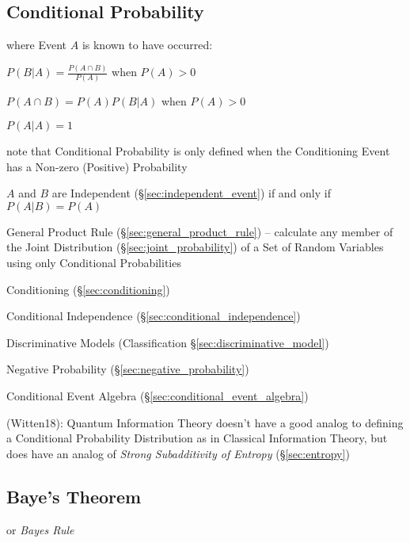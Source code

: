 \subsection{Conditional Probability}\label{sec:conditional_probability}

where Event $A$ is known to have occurred:

$P(B|A) = \frac{P(A \cap B)}{P(A)}$ when $P(A) > 0$

$P(A \cap B) = P(A) P(B|A)$ when $P(A) > 0$

$P(A|A) = 1$

note that Conditional Probability is only defined when the Conditioning Event
has a Non-zero (Positive) Probability

$A$ and $B$ are Independent (\S\ref{sec:independent_event}) if and only if
$P(A|B) = P(A)$

General Product Rule (\S\ref{sec:general_product_rule}) -- calculate any member
of the Joint Distribution (\S\ref{sec:joint_probability}) of a Set of Random
Variables using only Conditional Probabilities

\fist Conditioning (\S\ref{sec:conditioning})

\fist Conditional Independence (\S\ref{sec:conditional_independence})

\fist Discriminative Models (Classification \S\ref{sec:discriminative_model})

\fist Negative Probability (\S\ref{sec:negative_probability})

\fist Conditional Event Algebra (\S\ref{sec:conditional_event_algebra})

(Witten18): Quantum Information Theory doesn't have a good analog to defining a
Conditional Probability Distribution as in Classical Information Theory, but
does have an analog of \emph{Strong Subadditivity of Entropy}
(\S\ref{sec:entropy})



\subsection{Baye's Theorem}\label{sec:bayes_theorem}

or \emph{Bayes Rule}


